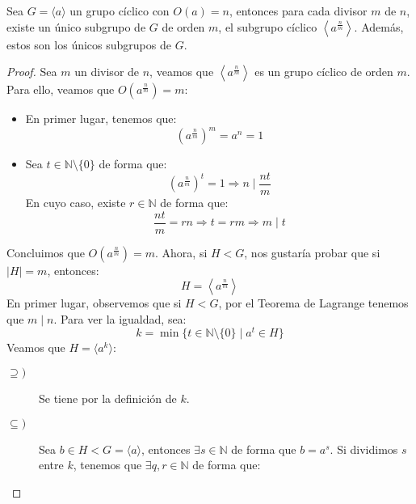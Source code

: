 \begin{prop}
    Sea $G=\langle a \rangle $ un grupo cíclico con $O(a) = n$, entonces para cada divisor $m$ de $n$, existe un único subgrupo de $G$ de orden $m$, el subgrupo cíclico $\left\langle a^{\frac{n}{m}} \right\rangle$.
    Además, estos son los únicos subgrupos de $G$. %
    \begin{proof}
        Sea $m$ un divisor de $n$, veamos que $\left\langle a^{\frac{n}{m}} \right\rangle $ es un grupo cíclico de orden $m$. Para ello, veamos que $O\left(a^{\frac{n}{m}}\right) = m$:
        \begin{itemize}
            \item En primer lugar, tenemos que:
                \begin{equation*}
                    {(a^{\frac{n}{m}})}^{m} = a^n = 1
                \end{equation*}
            \item Sea $t\in \mathbb{N}\setminus\{0\}$ de forma que:
                \begin{equation*}
                    {(a^{\frac{n}{m}})}^{t} = 1 \Longrightarrow n \mid \dfrac{nt}{m}
                \end{equation*}
                En cuyo caso, existe $r\in \mathbb{N}$ de forma que:
                \begin{equation*}
                    \dfrac{nt}{m} = rn \Longrightarrow t = rm \Longrightarrow m \mid t
                \end{equation*}
        \end{itemize}
        Concluimos que $O(a^{\frac{n}{m}}) = m$. Ahora, si $H<G$, nos gustaría probar que si $|H| = m$, entonces:
        \begin{equation*}
            H = \left\langle a^{\frac{n}{m}} \right\rangle 
        \end{equation*}
        En primer lugar, observemos que si $H<G$, por el Teorema de Lagrange tenemos que $m\mid n$. Para ver la igualdad, sea:
        \begin{equation*}
            k = \min\{t\in \mathbb{N}\setminus\{0\}\mid a^t \in H\}
        \end{equation*}
        Veamos que $H = \langle a^k \rangle $:
        \begin{description}
            \item [$\supseteq)$] Se tiene por la definición de $k$.
            \item [$\subseteq)$] Sea $b\in H < G = \langle a \rangle $, entonces $\exists s\in \mathbb{N}$ de forma que $b = a^s$. Si dividimos $s$ entre $k$, tenemos que $\exists q,r\in \mathbb{N}$ de forma que:

\end{description}
\end{proof}
\end{prop}
